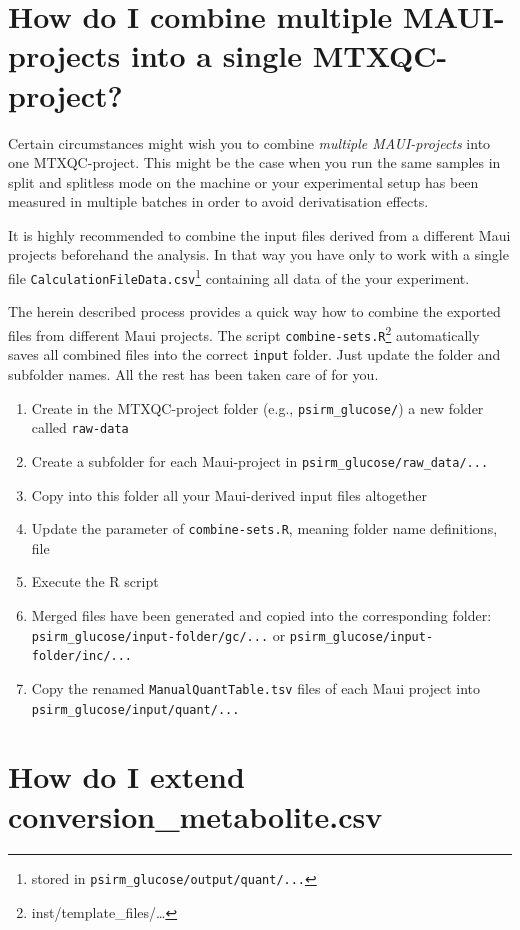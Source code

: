 \documentclass[]{book}
\providecommand{\tightlist}{%
  \setlength{\itemsep}{0pt}\setlength{\parskip}{0pt}}
\let\rmarkdownfootnote\footnote%
\def\footnote{\protect\rmarkdownfootnote}
\theoremstyle{definition}
\theoremstyle{definition}
\theoremstyle{definition}
\theoremstyle{remark}
\begin{document}
\section{How do I combine multiple MAUI-projects into a single
MTXQC-project?}\label{multipleproj}

Certain circumstances might wish you to combine \emph{multiple
MAUI-projects} into one MTXQC-project. This might be the case when you
run the same samples in split and splitless mode on the machine or your
experimental setup has been measured in multiple batches in order to
avoid derivatisation effects.

It is highly recommended to combine the input files derived from a
different Maui projects beforehand the analysis. In that way you have
only to work with a single file
\texttt{CalculationFileData.csv}\footnote{stored in
  \texttt{psirm\_glucose/output/quant/...}} containing all data of the
your experiment.

The herein described process provides a quick way how to combine the
exported files from different Maui projects. The script
\texttt{combine-sets.R}\footnote{inst/template\_files/\ldots{}}
automatically saves all combined files into the correct \texttt{input}
folder. Just update the folder and subfolder names. All the rest has
been taken care of for you.

\begin{enumerate}
\def\labelenumi{\arabic{enumi}.}
\tightlist
\item
  Create in the MTXQC-project folder (e.g., \texttt{psirm\_glucose/}) a
  new folder called \texttt{raw-data}
\item
  Create a subfolder for each Maui-project in
  \texttt{psirm\_glucose/raw\_data/...}
\item
  Copy into this folder all your Maui-derived input files altogether
\item
  Update the parameter of \texttt{combine-sets.R}, meaning folder name
  definitions, file
\item
  Execute the R script
\item
  Merged files have been generated and copied into the corresponding
  folder: \texttt{psirm\_glucose/input-folder/gc/...} or
  \texttt{psirm\_glucose/input-folder/inc/...}
\item
  Copy the renamed \texttt{ManualQuantTable.tsv} files of each Maui
  project into \texttt{psirm\_glucose/input/quant/...}
\end{enumerate}

\section{How do I extend conversion\_metabolite.csv}\label{extendconse}
\end{document}
